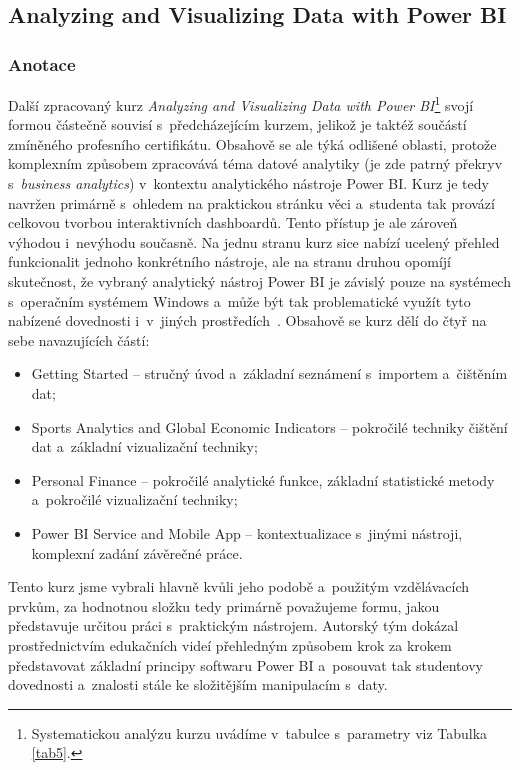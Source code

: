 \hypertarget{analyzing-and-visualizing-data-with-power-bi}{%
\subsection{Analyzing and Visualizing Data with Power BI}\label{analyzing-and-visualizing-data-with-power-bi}}

\hypertarget{anotace-4}{%
\subsubsection{Anotace}\label{anotace-4}}

Další zpracovaný kurz \emph{Analyzing and Visualizing Data with Power BI}\footnote{Systematickou analýzu kurzu uvádíme v~tabulce s~parametry viz Tabulka \ref{tab5}.} svojí formou částečně souvisí s~předcházejícím kurzem, jelikož je taktéž součástí zmíněného profesního certifikátu. Obsahově se ale týká odlišené oblasti, protože komplexním způsobem zpracovává téma datové analytiky (je zde patrný překryv s~\emph{business analytics}) v~kontextu analytického nástroje Power BI. Kurz je tedy navržen primárně s~ohledem na praktickou stránku věci a~studenta tak provází celkovou tvorbou interaktivních dashboardů. Tento přístup je ale zároveň výhodou i~nevýhodu současně. Na jednu stranu kurz sice nabízí ucelený přehled funkcionalit jednoho konkrétního nástroje, ale na stranu druhou opomíjí skutečnost, že vybraný analytický nástroj Power BI je závislý pouze na systémech s~operačním systémem Windows a~může být tak problematické využít tyto nabízené dovednosti i~v~jiných prostředích~\parencite{course5}. Obsahově se kurz dělí do čtyř na sebe navazujících částí:

\begin{itemize}
\tightlist
\item
  Getting Started -- stručný úvod a~základní seznámení s~importem a~čištěním dat;
\item
  Sports Analytics and Global Economic Indicators -- pokročilé techniky čištění dat a~základní vizualizační techniky;
\item
  Personal Finance -- pokročilé analytické funkce, základní statistické metody a~pokročilé vizualizační techniky;
\item
  Power BI Service and Mobile App -- kontextualizace s~jinými nástroji, komplexní zadání závěrečné práce.
\end{itemize}

Tento kurz jsme vybrali hlavně kvůli jeho podobě a~použitým vzdělávacích prvkům, za hodnotnou složku tedy primárně považujeme formu, jakou představuje určitou práci s~praktickým nástrojem. Autorský tým dokázal prostřednictvím edukačních videí přehledným způsobem krok za krokem představovat základní principy softwaru Power BI a~posouvat tak studentovy dovednosti a~znalosti stále ke složitějším manipulacím s~daty.

